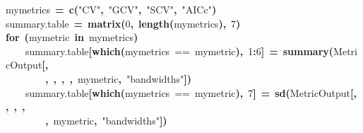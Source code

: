 \documentclass{article}
\makeatletter
\newcommand{\hlnumber}[1]{\textcolor[rgb]{0,0,0}{#1}}%
\newcommand{\hlfunctioncall}[1]{\textcolor[rgb]{0.501960784313725,0,0.329411764705882}{\textbf{#1}}}%
\newcommand{\hlstring}[1]{\textcolor[rgb]{0.6,0.6,1}{#1}}%
\newcommand{\hlkeyword}[1]{\textcolor[rgb]{0,0,0}{\textbf{#1}}}%
\newcommand{\hlassignement}[1]{\textcolor[rgb]{0,0,0}{\textbf{#1}}}%
\newcommand{\hlsymbol}[1]{\textcolor[rgb]{0,0,0}{#1}}%
\newcommand{\hlstd}[1]{\textcolor[rgb]{0,0,0}{#1}}%
\newenvironment{kframe}{%
 \def\FrameCommand##1{\hskip\@totalleftmargin \hskip-\fboxsep
 \colorbox{shadecolor}{##1}\hskip-\fboxsep
     \hskip-\linewidth \hskip-\@totalleftmargin \hskip\columnwidth}%
 \MakeFramed {\advance\hsize-\width
   \@totalleftmargin\z@ \linewidth\hsize
   \@setminipage}}%
 {\par\unskip\endMakeFramed}
\newenvironment{knitrout}{}{} %
\makeatother
\begin{document}
\begin{knitrout}
\color{fgcolor}\begin{kframe}
\begin{flushleft}
\ttfamily\noindent
\hlsymbol{mymetrics}{\ }\hlassignement{=}{\ }\hlfunctioncall{c}\hlkeyword{(}\hlstring{"{}CV"{}}\hlkeyword{,}{\ }\hlstring{"{}GCV"{}}\hlkeyword{,}{\ }\hlstring{"{}SCV"{}}\hlkeyword{,}{\ }\hlstring{"{}AICc"{}}\hlkeyword{)}\hspace*{\fill}\\
\hlstd{}\hlsymbol{summary.table}{\ }\hlassignement{=}{\ }\hlfunctioncall{matrix}\hlkeyword{(}\hlnumber{0}\hlkeyword{,}{\ }\hlfunctioncall{length}\hlkeyword{(}\hlsymbol{mymetrics}\hlkeyword{)}\hlkeyword{,}{\ }\hlnumber{7}\hlkeyword{)}\hspace*{\fill}\\
\hlstd{}\hlkeyword{for}{\ }\hlkeyword{(}\hlsymbol{mymetric}{\ }\hlkeyword{in}{\ }\hlsymbol{mymetrics}\hlkeyword{)}{\ }\hlkeyword{\usebox{\hlnormalsizeboxopenbrace}}\hspace*{\fill}\\
\hlstd{}{\ }{\ }{\ }{\ }\hlsymbol{summary.table}\hlkeyword{[}\hlfunctioncall{which}\hlkeyword{(}\hlsymbol{mymetrics}{\ }=={\ }\hlsymbol{mymetric}\hlkeyword{)}\hlkeyword{,}{\ }\hlnumber{1}\hlkeyword{:}\hlnumber{6}\hlkeyword{]}{\ }\hlassignement{=}{\ }\hlfunctioncall{summary}\hlkeyword{(}\hlsymbol{MetricOutput}\hlkeyword{[}\hlkeyword{,}\hspace*{\fill}\\
\hlstd{}{\ }{\ }{\ }{\ }{\ }{\ }{\ }{\ }\hlkeyword{,}{\ }\hlkeyword{,}{\ }\hlkeyword{,}{\ }\hlkeyword{,}{\ }\hlsymbol{mymetric}\hlkeyword{,}{\ }\hlstring{"{}bandwidths"{}}\hlkeyword{]}\hlkeyword{)}\hspace*{\fill}\\
\hlstd{}{\ }{\ }{\ }{\ }\hlsymbol{summary.table}\hlkeyword{[}\hlfunctioncall{which}\hlkeyword{(}\hlsymbol{mymetrics}{\ }=={\ }\hlsymbol{mymetric}\hlkeyword{)}\hlkeyword{,}{\ }\hlnumber{7}\hlkeyword{]}{\ }\hlassignement{=}{\ }\hlfunctioncall{sd}\hlkeyword{(}\hlsymbol{MetricOutput}\hlkeyword{[}\hlkeyword{,}{\ }\hlkeyword{,}{\ }\hlkeyword{,}{\ }\hlkeyword{,}\hspace*{\fill}\\
\hlstd{}{\ }{\ }{\ }{\ }{\ }{\ }{\ }{\ }\hlkeyword{,}{\ }\hlsymbol{mymetric}\hlkeyword{,}{\ }\hlstring{"{}bandwidths"{}}\hlkeyword{]}\hlkeyword{)}\hspace*{\fill}\\
\hlstd{}\hlkeyword{\usebox{\hlnormalsizeboxclosebrace}}\hspace*{\fill}\\

\end{flushleft}
\end{kframe}
\end{knitrout}
\end{document}
